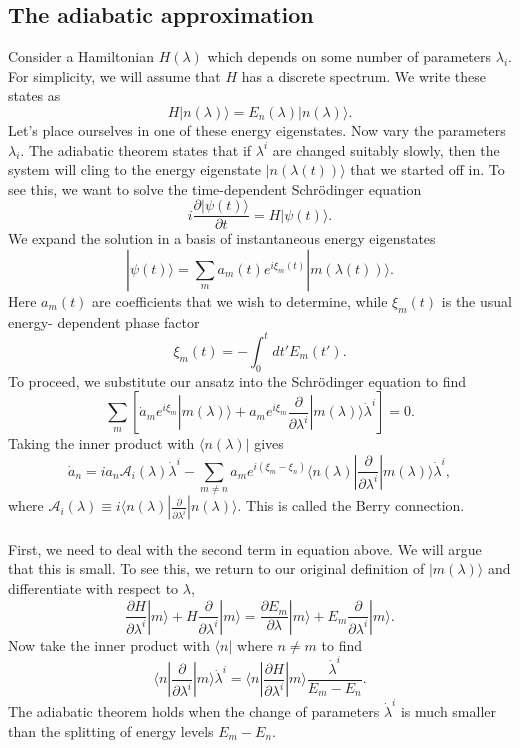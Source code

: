 \subsection{The adiabatic approximation}
Consider a Hamiltonian $H(\lambda)$ which depends on some number of parameters $\lambda_i$. 
For simplicity, we will assume that $H$ has a discrete spectrum. We write these states as
\[H|n(\lambda)\rangle = E_n(\lambda) |n(\lambda)\rangle.\]
Let's place ourselves in one of these energy eigenstates. Now vary the parameters $\lambda_i$.
The adiabatic theorem states that if $\lambda^i$ are changed suitably slowly, then the system will cling to the energy eigenstate $|n(\lambda(t))\rangle$ that we started off in.
To see this, we want to solve the time-dependent Schr\"{o}dinger equation
\[i\frac{\partial |\psi(t)\rangle}{\partial t} = H |\psi(t)\rangle.\]
We expand the solution in a basis of instantaneous energy eigenstates
\[|\psi(t)\rangle = \sum_m a_m(t) e^{i\xi_m(t)} |m(\lambda(t))\rangle.\]
Here $a_m(t)$ are coefficients that we wish to determine, while $\xi_m(t)$ is the usual energy-
dependent phase factor
\[\xi_m(t) = - \int_0^t dt' E_m(t').\]
To proceed, we substitute our ansatz into the Schr\"{o}dinger equation to find
\[\sum_m \left[\dot{a}_m e^{i\xi_m}|m(\lambda)\rangle + a_m e^{i\xi_m} \frac{\partial }{\partial \lambda^i} |m(\lambda)\rangle\dot{\lambda}^i \right] = 0.\]
Taking the inner product with $\langle n(\lambda)|$ gives
\[\dot{a}_n = ia_n\mathcal{A}_i(\lambda) \dot{\lambda}^i - \sum_{m \neq n} a_m e^{i(\xi_m - \xi_n)} \langle n(\lambda) | \frac{\partial}{\partial \lambda^i} | m(\lambda)\rangle\dot{\lambda}^i,\]
where $\mathcal{A}_i(\lambda) \equiv i\langle n(\lambda) | \frac{\partial}{\partial \lambda^i} | n(\lambda)\rangle$.
This is called the Berry connection.
\\ \\
First, we need to deal with the second term in equation above. We will argue that this is small. 
To see this, we return to our original definition of $|m(\lambda)\rangle$ and differentiate with respect to $\lambda$,
\[\frac{\partial H}{\partial \lambda^i} |m\rangle + H \frac{\partial }{\partial \lambda^i} |m\rangle = \frac{\partial E_m}{\partial \lambda} |m\rangle + E_m \frac{\partial}{\partial \lambda^i} |m\rangle .\]
Now take the inner product with $\langle n |$ where $n \neq m$ to find
\[ \langle n | \frac{\partial}{\partial \lambda^i} | m\rangle \dot{\lambda}^i = \langle n | \frac{\partial H}{\partial \lambda^i} | m\rangle \frac{\dot{\lambda}^i}{E_m - E_n} .\]
The adiabatic theorem holds when the change of parameters $\dot{\lambda}^i$ is much smaller than the splitting of energy levels $E_m -E_n$. 
